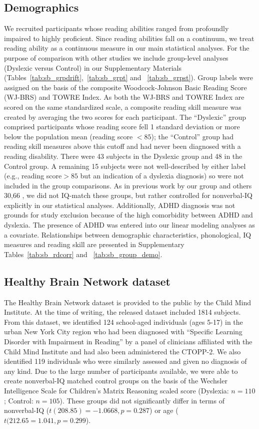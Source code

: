 \documentclass[../uwthesis.tex]{subfiles}
\begin{document}
\subsection{Demographics}
We recruited participants whose reading abilities ranged from profoundly impaired to highly proficient. Since reading abilities fall on a continuum, we treat reading ability as a
continuous measure in our main statistical analyses. For the purpose of comparison with other studies we include group-level analyses (Dyslexic versus Control) in our Supplementary Materials (Tables~\ref{tab:sb_grpdrift},~\ref{tab:sb_grpt} and ~\ref{tab:sb_grpst}). Group labels were assigned on the basis of the composite Woodcock-Johnson Basic Reading Score
(WJ-BRS) and TOWRE Index. As both the WJ-BRS and TOWRE Index are scored on the same standardized scale, a composite reading skill measure was created by averaging the two scores for
each participant. The “Dyslexic” group comprised participants whose reading score fell 1 standard deviation or more below the population mean (reading score $<85$); the “Control” group had
reading skill measures above this cutoff and had never been diagnosed with a reading disability. There were 43 subjects in the Dyslexic group and 48 in the Control group. A remaining 15 subjects were not well-described by either label (e.g., reading score$>85$ but an indication of a dyslexia
diagnosis) so were not included in the group comparisons. As in previous work by our group and others 30,66 , we did not IQ-match these groups, but rather controlled for nonverbal-IQ explicitly in our statistical analyses. Additionally, ADHD diagnosis was not grounds for study exclusion because of the high comorbidity between ADHD and dyslexia. The presence of ADHD was
entered into our linear modeling analyses as a covariate. Relationships between demographic characteristics, phonological, IQ measures and reading skill are presented in Supplementary Tables~\ref{tab:sb_rdcorr} and ~\ref{tab:sb_group_demo}.

\subsection{Healthy Brain Network dataset}
The Healthy Brain Network dataset is provided to the public by the Child Mind Institute. At the time of writing, the released dataset included 1814 subjects. From this dataset, we identified
124 school-aged individuals (ages 5-17) in the urban New York City region who had been diagnosed with “Specific Learning Disorder with Impairment in Reading” by a panel of clinicians affiliated with the Child Mind Institute and had also been administered the CTOPP-2. We also identified 119 individuals who were similarly assessed and given no diagnosis of any kind. Due to the large number of participants available, we were able to create nonverbal-IQ matched control groups on the basis of the Wechsler Intelligence Scale for Children’s Matrix Reasoning scaled score (Dyslexia: $n = 110$; Control: $n = 105$). These groups did not significantly differ in terms of
nonverbal-IQ ($t(208.85) = -1.0668, p = 0.287$) or age ($t(212.65 = 1.041, p = 0.299$).
\end{document}

